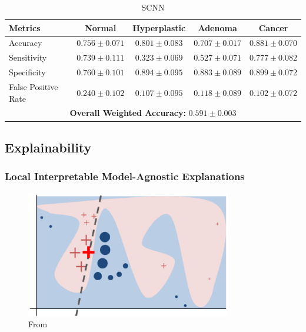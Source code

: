 \begin{table}[ht] \centering \caption{SCNN} \label{tab:scnn_tpl3}
\begin{tabular}{lcccc} \toprule Metrics & Normal & Hyperplastic & Adenoma & Cancer \\
\midrule
Accuracy & $0.756\pm0.071$ & $0.801\pm0.083$ & $0.707\pm0.017$ & $0.881\pm0.070$ \\
Sensitivity & $0.739\pm0.111$ & $0.323\pm0.069$ & $0.527\pm0.071$ & $0.777\pm0.082$ \\
Specificity & $0.760\pm0.101$ & $0.894\pm0.095$ & $0.883\pm0.089$ & $0.899\pm0.072$ \\
False Positive Rate & $0.240\pm0.102$ & $0.107\pm0.095$ & $0.118\pm0.089$ & $0.102\pm0.072$ \\
\midrule \multicolumn{5}{c}{\textbf{Overall Weighted Accuracy:} $0.591\pm0.003$} \\
\bottomrule \end{tabular} \end{table}


\subsection{Explainability}
\subsubsection{Local Interpretable Model-Agnostic Explanations}
\begin{figure}[htbp]
  \centering
  \includegraphics[width=0.8\textwidth]{Images/lime_explanation.png}
  \caption{From \cite{ribeiro_why_2016}}
  \label{fig:my-label}
\end{figure}

